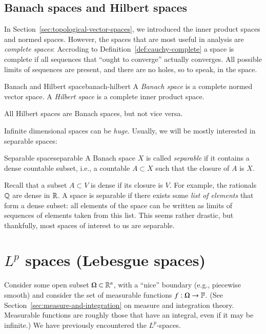 \subsection{Banach spaces and Hilbert spaces}

In Section~\ref{sec:topological-vector-spaces}, we introduced the inner product spaces and normed spaces. However, the spaces that are most useful in analysis are \emph{complete spaces}: Accroding to Definition~\ref{def:cauchy-complete} a space is complete if all sequences that ``ought to converge'' actually converges. All possible limits of sequences are present, and there are no holes, so to speak, in the space.

\begin{myDefinition}{Banach and Hilbert space}{banach-hilbert}
    A \emph{Banach space} is a complete normed vector space. A \emph{Hilbert space} is a complete inner product space.
\end{myDefinition}
All Hilbert spaces are Banach spaces, but not vice versa.


Infinite dimensional spaces can be \emph{huge}. Usually, we will be mostly interested in separable spaces:
\begin{myDefinition}{Separable space}{separable}
A Banach space $X$ is called \emph{separable} if it contains a dense countable subset, i.e., a countable $A \subset X$ such that the closure of $A$ is $X$. 
\end{myDefinition}


Recall that a subset $A\subset V$ is dense if its closure is $V$. For example, the rationals $\mathbb{Q}$ are dense in $\mathbb{R}$. A space is separable if there exists some \emph{list of elements} that form a dense subset: all elements of the space can be written as limits of sequences of elements taken from this list. This seems rather drastic, but thankfully, most spaces of interest to us are separable.


\section{$L^p$ spaces (Lebesgue spaces)}


Consider some open subset $\Omega \subset \mathbb{R}^n$, with a ``nice'' boundary (e.g., piecewise smooth) and consider the set of measurable functions $f : \Omega \to \mathbb{F}$. (See Section~\ref{sec:measure-and-integration} on measure and integration theory. Measurable functions are roughly those that have an integral, even if it may be infinite.) We have previously encountered the $L^p$-spaces.

